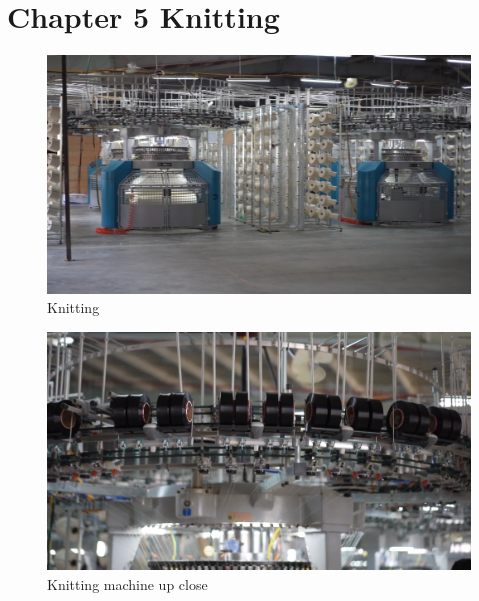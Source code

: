 \section{Chapter 5 Knitting}
\begin{figure}[h!]
    \centering
    \includegraphics[width=1\linewidth]{figs/knitting.jpg}
    \caption{Knitting}
    \label{fig:knitting}
\end{figure}

\begin{figure}[h!]
    \centering
    \includegraphics[width=1\linewidth]{figs/knitting_closeup.jpg}
    \caption{Knitting machine up close}
    \label{fig:knitting_closeup}
\end{figure}
